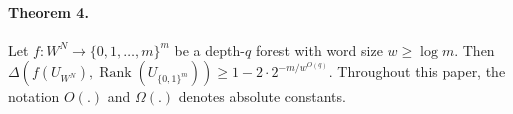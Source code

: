 \paragraph{Theorem 4.}
Let $f:W^N\to\{0,1,\ldots,m\}^m$ be a depth-$q$ forest with word size $w\geq\log m$. Then $\Delta(f(U_{W^N}),\operatorname{Rank}(U_{\{0,1\}^m}))\geq1-2\cdot2^{-m/w^{O(q)}}$.
Throughout this paper, the notation $O(.)$ and $\Omega(.)$ denotes absolute constants.
